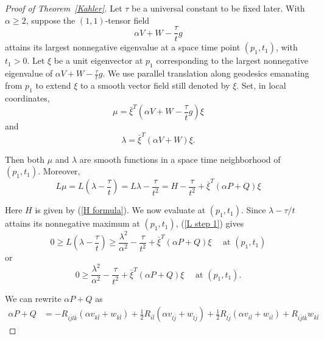 \documentclass{amsart}
\theoremstyle{definition}
\theoremstyle{remark}
\numberwithin{equation}{section}
\begin{document}
\begin{proof}[Proof of Theorem~\ref{Kahler}]
Let $\tau$ be a universal constant to be fixed later. With $\alpha\geq 2$, suppose the $(1,1)$-tensor field
\[
\alpha V+W-\frac{\tau}{t} g
\]
attains its largest nonnegative eigenvalue at a space time point $\left(p_1, t_1\right)$, with $t_1>0$. Let $\xi$ be a unit eigenvector at $p_1$ corresponding to the largest nonnegative eigenvalue of $\alpha V+W-\frac{\tau}{t} g$. 
We use parallel translation along geodesics emanating from $p_1$ to extend $\xi$ to a smooth vector field still denoted by $\xi$. Set, in local coordinates,
\begin{equation}
  \mu=\bar{\xi}^T\left(\alpha V+W-\frac{\tau}{t} g\right) \xi
\end{equation}
and
\begin{equation}\label{def lambda}
  \lambda=\bar{\xi}^T(\alpha V+W) \xi .
\end{equation}

Then both $\mu$ and $\lambda$ are smooth functions in a space time neighborhood of $\left(p_1, t_1\right)$. Moreover,
\[
L \mu=L\left(\lambda-\frac{\tau}{t}\right)=L \lambda-\frac{\tau}{t^2}=H-\frac{\tau}{t^2}+\bar{\xi}^T(\alpha P+Q) \xi
\]

Here $H$ is given by (\ref{H formula}). We now evaluate at $\left(p_1, t_1\right)$. Since $\lambda-\tau / t$ attains its nonnegative maximum at $\left(p_1, t_1\right)$, (\ref{L step 1}) gives
\[
0 \geq L\left(\lambda-\frac{\tau}{t}\right) \geq \frac{\lambda^2}{\alpha^2}-\frac{\tau}{t^2}+\bar{\xi}^T(\alpha P+Q) \xi \quad \text { at }\left(p_1, t_1\right)
\]
or
\begin{equation} \label{eq:2.11}
  0\geq\frac{\lambda^{2}}{\alpha^{2}}-\frac{\tau}{t^2}+\bar{\xi}^T(\alpha P+Q)\xi \quad \text { at }\left(p_1, t_1\right).
\end{equation}

We can rewrite $\alpha P+Q$ as
\begin{align}\label{alpha P+Q}
\alpha P+Q&=-R_{i\bar{j}l\bar{k}}(\alpha v_{k\bar{l}}+w_{k\bar{l}})+\frac{1}{2}R_{i\bar{l}}(\alpha v_{l\bar{j}}+w_{l\bar{j}})+\frac{1}{2}R_{l\bar{j}}(\alpha v_{i\bar{l}}+w_{i\bar{l}})+R_{i\bar{j}l\bar{k}}w_{k\bar{l}}
\end{align} 


\end{proof}
\end{document}
